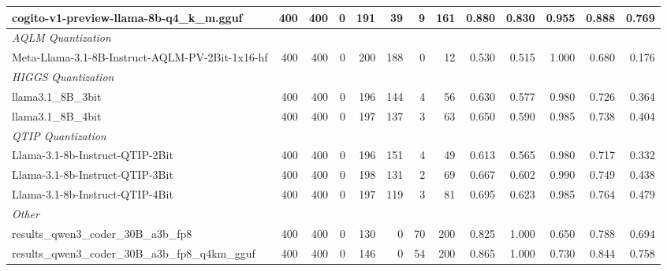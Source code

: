 \begin{table}[htbp]
{\begin{tabular}{lrrrrrrrrrrrr}
    cogito-v1-preview-llama-8b-q4\_k\_m.gguf & 400 & 400 & 0 & 191 & 39 & 9 & 161 & 0.880 & 0.830 & 0.955 & 0.888 & 0.769 \\
    \midrule
    \multicolumn{13}{l}{\textit{AQLM Quantization}} \\
    \midrule
    Meta-Llama-3.1-8B-Instruct-AQLM-PV-2Bit-1x16-hf & 400 & 400 & 0 & 200 & 188 & 0 & 12 & 0.530 & 0.515 & 1.000 & 0.680 & 0.176 \\
    \midrule
    \multicolumn{13}{l}{\textit{HIGGS Quantization}} \\
    \midrule
    llama3.1\_8B\_3bit & 400 & 400 & 0 & 196 & 144 & 4 & 56 & 0.630 & 0.577 & 0.980 & 0.726 & 0.364 \\
    llama3.1\_8B\_4bit & 400 & 400 & 0 & 197 & 137 & 3 & 63 & 0.650 & 0.590 & 0.985 & 0.738 & 0.404 \\
    \midrule
    \multicolumn{13}{l}{\textit{QTIP Quantization}} \\
    \midrule
    Llama-3.1-8b-Instruct-QTIP-2Bit & 400 & 400 & 0 & 196 & 151 & 4 & 49 & 0.613 & 0.565 & 0.980 & 0.717 & 0.332 \\
    Llama-3.1-8b-Instruct-QTIP-3Bit & 400 & 400 & 0 & 198 & 131 & 2 & 69 & 0.667 & 0.602 & 0.990 & 0.749 & 0.438 \\
    Llama-3.1-8b-Instruct-QTIP-4Bit & 400 & 400 & 0 & 197 & 119 & 3 & 81 & 0.695 & 0.623 & 0.985 & 0.764 & 0.479 \\
    \midrule
    \multicolumn{13}{l}{\textit{Other}} \\
    \midrule
    results\_qwen3\_coder\_30B\_a3b\_fp8 & 400 & 400 & 0 & 130 & 0 & 70 & 200 & 0.825 & 1.000 & 0.650 & 0.788 & 0.694 \\
    results\_qwen3\_coder\_30B\_a3b\_fp8\_q4km\_gguf & 400 & 400 & 0 & 146 & 0 & 54 & 200 & 0.865 & 1.000 & 0.730 & 0.844 & 0.758 \\
    \bottomrule
  \end{tabular}
  }
\end{table}

